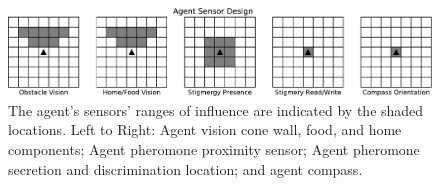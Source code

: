 \begin{figure}
\begin{center}
\includegraphics[width=\textwidth]{img/sense_explanatory}
\caption{
The agent's sensors' ranges of influence are indicated by the shaded locations. Left to Right: Agent vision cone wall, food, and home components; Agent pheromone proximity sensor; Agent pheromone secretion and discrimination location; and agent compass.
}
\label{fig:sense_explanatory}
\end{center}
\end{figure}
